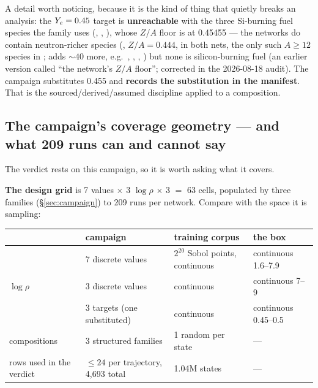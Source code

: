 A detail worth noticing, because it is the kind of thing that quietly breaks an
analysis: the $Y_{e} = 0.45$ target is \textbf{unreachable} with the three
Si-burning fuel species the family uses (, ,
), whose $Z/A$ floor is  at 0.45455 --- the networks do
contain neutron-richer species (, $Z/A = 0.444$, in both nets, the
only such $A \ge 12$ species in ;  adds ${\sim}40$ more, e.g.\
, , , ) but none is
silicon-burning fuel (an earlier version called \nuc{Ne}{22} ``the network's
$Z/A$ floor''; corrected in the 2026-08-18 audit). The campaign substitutes
0.455 and \textbf{records the substitution in the manifest}. That is the
sourced/derived/assumed discipline applied to a composition.

\subsection{The campaign's coverage geometry --- and what 209 runs can and
            cannot say}
\label{sec:coverage}

The verdict rests on this campaign, so it is worth asking what it covers.

\textbf{The design grid} is 7 \Tn{} values $\times$ 3 $\log\rho$ $\times$ 3
\Ye{} $=$ 63 cells, populated by three families (\S\ref{sec:campaign}) to 209
runs per network. Compare with the space it is sampling:

\begingroup\small
\begin{center}
\begin{tabularx}{\textwidth}{@{}L{2.9cm} L{3.6cm} L{3.4cm} Y@{}}
\toprule
 & \textbf{campaign} & \textbf{training corpus} & \textbf{the box} \\
\midrule
\Tn & 7 discrete values & $2^{20}$ Sobol points, continuous &
  continuous 1.6--7.9 \\
$\log\rho$ & 3 discrete values & continuous & continuous 7--9 \\
\Ye & 3 targets (one substituted) & continuous & continuous 0.45--0.5 \\
compositions & 3 structured families & 1 random per state & --- \\
rows used in the verdict & $\le 24$ per trajectory, 4,693 total &
  1.04M states & --- \\
\bottomrule
\end{tabularx}
\end{center}
\endgroup

